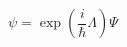 \begin{equation}
\psi =\exp \left( \frac{i}{\hbar }\Lambda \right) \Psi  \label{eq5}
\end{equation}


